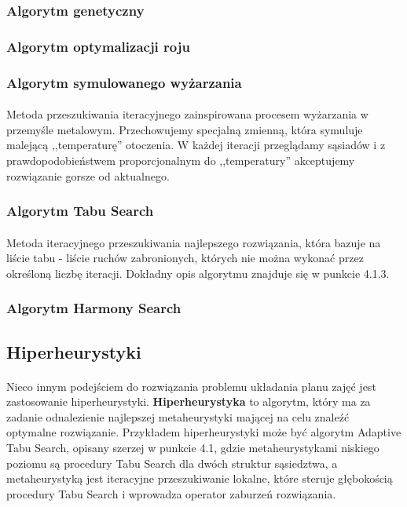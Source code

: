 \subsubsection{Algorytm genetyczny}

\subsubsection{Algorytm optymalizacji roju}

\subsubsection{Algorytm symulowanego wyżarzania}
\paragraph{} Metoda przeszukiwania iteracyjnego zainspirowana procesem wyżarzania w przemyśle metalowym. Przechowujemy specjalną zmienną, która symuluje malejącą ,,temperaturę'' otoczenia. W każdej iteracji przeglądamy sąsiadów i z prawdopodobieństwem proporcjonalnym do ,,temperatury'' akceptujemy rozwiązanie gorsze od aktualnego. 


\subsubsection{Algorytm Tabu Search}
\paragraph{} Metoda iteracyjnego przeszukiwania najlepszego rozwiązania, która bazuje na liście tabu - liście ruchów zabronionych, których nie można wykonać przez określoną liczbę iteracji. Dokładny opis algorytmu znajduje się w punkcie 4.1.3.
\subsubsection{Algorytm Harmony Search}


\subsection{Hiperheurystyki}
\paragraph{}Nieco innym podejściem do rozwiązania problemu układania planu zajęć jest zastosowanie hiperheurystyki. \textbf{Hiperheurystyka} to algorytm, który ma za zadanie odnalezienie najlepszej metaheurystyki mającej na celu znaleźć optymalne rozwiązanie. Przykładem hiperheurystyki może być algorytm Adaptive Tabu Search, opisany szerzej w punkcie 4.1, gdzie metaheurystykami niskiego poziomu są procedury Tabu Search dla dwóch struktur sąsiedztwa, a metaheurystyką jest iteracyjne przeszukiwanie lokalne, które steruje głębokością procedury Tabu Search i wprowadza operator zaburzeń rozwiązania.
